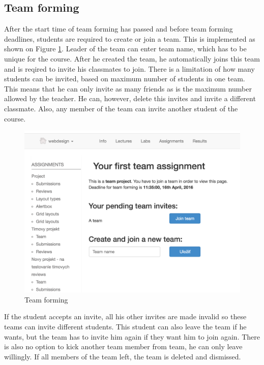 \subsection{Team forming}
After the start time of team forming has passed and before team forming deadlines, students are required to create or join a team. This is implemented as shown on Figure \ref{team_forming}. Leader of the team can enter team name, which has to be unique for the course. After he created the team, he automatically joins this team and is reqired to invite his classmates to join. There is a limitation of how many students can be invited, based on maximum number of students in one team. This means that he can only invite as many friends as is the maximum number allowed by the teacher. He can, however, delete this invites and invite a different classmate. Also, any member of the team can invite another student of the course.

\begin{figure}[h]
    \centering
    \includegraphics[width=\textwidth]{images/teamforming.png}
    \caption{Team forming}
    \label{team_forming}
\end{figure}

If the student accepts an invite, all his other invites are made invalid so these teams can invite different students. This student can also leave the team if he wants, but the team has to invite him again if they want him to join again. There is also no option to kick another team member from team, he can only leave willingly. If all members of the team left, the team is deleted and dismissed.

